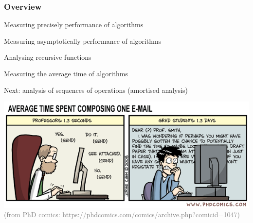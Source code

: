 \documentclass[aspectratio=169]{beamer}
\begin{document}
\frame[plain]{\titlepage}


\begin{frame}[t]\frametitle{Overview}


  \begin{itemize}
    {\color{black!25}
    \item Measuring {precisely} performance of algorithms
    \item Measuring {asymptotically} performance of algorithms
    \item Analysing {recursive} functions}
    \item Measuring  the \alert{average time} of algorithms
    \item Next: analysis of sequences of operations (\alert{amortised analysis})
  \end{itemize}
\end{frame}


\begin{frame}%
  \centering

  \includegraphics[width=\textwidth]{images/phd072508s}
  \\
  {\footnotesize \textcolor{gray}{(from PhD comics: https://phdcomics.com/comics/archive.php?comicid=1047)}}

\end{frame}
\end{document}
